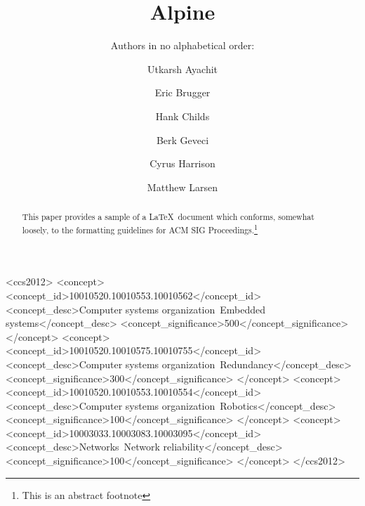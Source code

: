\documentclass[sigconf]{acmart}
\begin{document}
\title{Alpine}
\subtitle{Authors in no alphabetical order:}


\author{Utkarsh Ayachit}

\author{Eric Brugger}

\author{Hank Childs}


\author{Berk Geveci}

\author{Cyrus Harrison}

\author{Matthew Larsen}

\renewcommand{\shortauthors}{B. Trovato et al.}


\begin{abstract}
This paper provides a sample of a \LaTeX\ document which conforms,
somewhat loosely, to the formatting guidelines for
ACM SIG Proceedings.\footnote{This is an abstract footnote}
\end{abstract}

%
%
\begin{CCSXML}
<ccs2012>
 <concept>
  <concept_id>10010520.10010553.10010562</concept_id>
  <concept_desc>Computer systems organization~Embedded systems</concept_desc>
  <concept_significance>500</concept_significance>
 </concept>
 <concept>
  <concept_id>10010520.10010575.10010755</concept_id>
  <concept_desc>Computer systems organization~Redundancy</concept_desc>
  <concept_significance>300</concept_significance>
 </concept>
 <concept>
  <concept_id>10010520.10010553.10010554</concept_id>
  <concept_desc>Computer systems organization~Robotics</concept_desc>
  <concept_significance>100</concept_significance>
 </concept>
 <concept>
  <concept_id>10003033.10003083.10003095</concept_id>
  <concept_desc>Networks~Network reliability</concept_desc>
  <concept_significance>100</concept_significance>
 </concept>
</ccs2012>  
\end{CCSXML}
\end{document}
